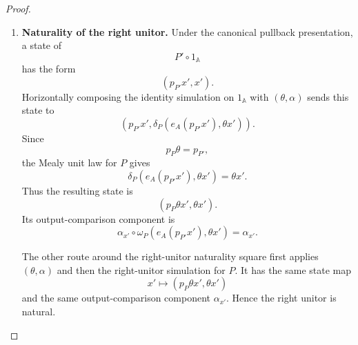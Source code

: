 \begin{proof}
\begin{enumerate}
        The other route around the left-unitor naturality square first applies
        the simulation \((\theta,\alpha)\) and then the left-unitor simulation
        for \(P\). It has the same state map
        \[
            x'\longmapsto(\theta x',q_P\theta x')
        \]
        and the same output-comparison component \(\alpha_{x'}\).
        Hence the left unitor is natural.

        \item \textbf{Naturality of the right unitor.}
        Under the canonical pullback presentation, a state of
        \[
            P'\circ1_{\mathbb A}
        \]
        has the form
        \[
            (p_{P'}x',x').
        \]
        Horizontally composing the identity simulation on \(1_{\mathbb A}\)
        with \((\theta,\alpha)\) sends this state to
        \[
            \left(
                p_{P'}x',
                \delta_P(e_A(p_{P'}x'),\theta x')
            \right).
        \]
        Since
        \[
            p_P\theta=p_{P'},
        \]
        the Mealy unit law for \(P\) gives
        \[
            \delta_P(e_A(p_{P'}x'),\theta x')
            =
            \theta x'.
        \]
        Thus the resulting state is
        \[
            (p_P\theta x',\theta x').
        \]
        Its output-comparison component is
        \[
            \alpha_{x'}
            \circ
            \omega_P(e_A(p_{P'}x'),\theta x')
            =
            \alpha_{x'}.
        \]

        The other route around the right-unitor naturality square first
        applies \((\theta,\alpha)\) and then the right-unitor simulation for
        \(P\). It has the same state map
        \[
            x'\longmapsto(p_P\theta x',\theta x')
        \]
        and the same output-comparison component \(\alpha_{x'}\).
        Hence the right unitor is natural.
    \end{enumerate}
\end{proof}

